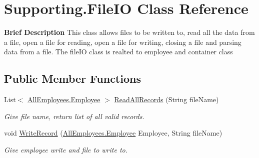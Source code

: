\hypertarget{class_supporting_1_1_file_i_o}{}\section{Supporting.\+File\+I\+O Class Reference}
\label{class_supporting_1_1_file_i_o}


{\bfseries Brief Description} This class allows files to be written to, read all the data from a file, open a file for reading, open a file for writing, closing a file and parsing data from a file. The file\+I\+O class is realted to employee and container class  


\subsection*{Public Member Functions}
\begin{DoxyCompactItemize}
\item 
List$<$ \hyperlink{class_all_employees_1_1_employee}{All\+Employees.\+Employee} $>$ \hyperlink{class_supporting_1_1_file_i_o_ab33154b7acbb27ecaee49cfe701691e7}{Read\+All\+Records} (String file\+Name)
\begin{DoxyCompactList}\small\item\em Give file name, return list of all valid records. \end{DoxyCompactList}\item 
void \hyperlink{class_supporting_1_1_file_i_o_a23293f70ec655e87ea568ffada174b9f}{Write\+Record} (\hyperlink{class_all_employees_1_1_employee}{All\+Employees.\+Employee} Employee, String file\+Name)
\begin{DoxyCompactList}\small\item\em Give employee write and file to write to. \end{DoxyCompactList}\end{DoxyCompactItemize}

